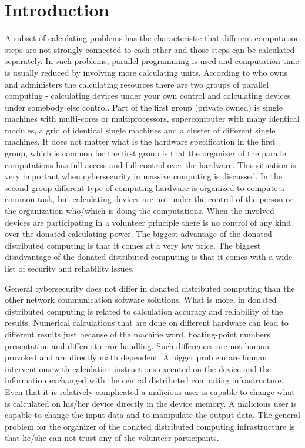 \documentclass[graybox]{svmult}
\begin{document}
\section{Introduction}
\label{sec:01}

A subset of calculating problems has the characteristic that different computation steps are not strongly connected to each other and those steps can be calculated separately. In such problems, parallel programming is used and computation time is usually reduced by involving more calculating units. According to who owns and administers the calculating resources there are two groups of parallel computing - calculating devices under your own control and calculating devices under somebody else control. Part of the first group (private owned) is single machines with multi-cores or multiprocessors, supercomputer with many identical modules, a grid of identical single machines and a cluster of different single machines. It does not matter what is the hardware specification in the first group, which is common for the first group is that the organizer of the parallel computations has full access and full control over the hardware. This situation is very important when cybersecurity in massive computing is discussed. In the second group different type of computing hardware is organized to compute a common task, but calculating devices are not under the control of the person or the organization who/which is doing the computations. When the involved devices are participating in a volunteer principle there is no control of any kind over the donated calculating power. The biggest advantage of the donated distributed computing is that it comes at a very low price. The biggest disadvantage of the donated distributed computing is that it comes with a wide list of security and reliability issues. 

General cybersecurity does not differ in donated distributed computing than the other network communication software solutions. What is more, in donated distributed computing is related to calculation accuracy and reliability of the results. Numerical calculations that are done on different hardware can lead to different results just because of the machine word, floating-point numbers presentation and different error handling. Such differences are not human provoked and are directly math dependent. A bigger problem are human interventions with calculation instructions executed on the device and the information exchanged with the central distributed computing infrastructure. Even that it is relatively complicated a malicious user is capable to change what is calculated on his/her device directly in the device memory. A malicious user is capable to change the input data and to manipulate the output data. The general problem for the organizer of the donated distributed computing infrastructure is that he/she can not trust any of the volunteer participants. 
\end{document}
